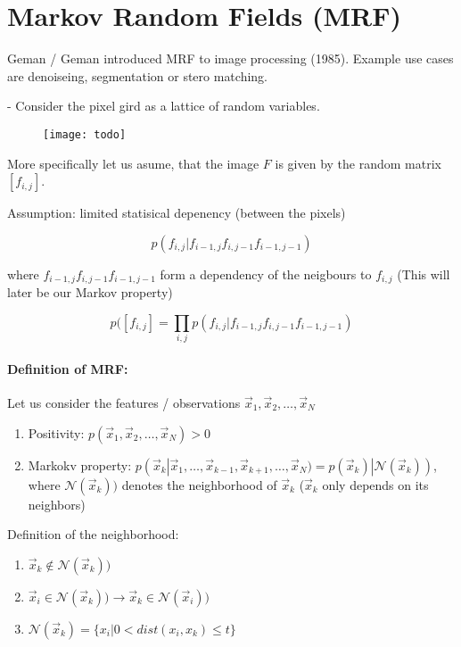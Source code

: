 
\section{Markov Random Fields (MRF)}

Geman / Geman introduced MRF to image processing (1985). Example use cases are denoiseing, segmentation or stero matching.

- Consider the pixel gird as a lattice of random variables.

\begin{figure}[H]
	\centering
	\texttt{[image: todo]}
\end{figure}

More specifically let us asume, that the image $F$ is given by the random matrix $[f_{i,j}]$.

Assumption: limited statisical depenency (between the pixels)

\begin{equation*}
    p(f_{i, j} | f_{i-1, j} f_{i, j-1} f_{i-1, j-1})
\end{equation*}

where $f_{i-1, j} f_{i, j-1} f_{i-1, j-1}$ form a dependency of the neigbours to $f_{i,j}$ (This will later be our Markov property)

\begin{equation*}
    p([f_{i, j}] = \prod_{i,j} p(f_{i, j} | f_{i-1, j} f_{i, j-1} f_{i-1, j-1})
\end{equation*}

\paragraph{Definition of MRF:\\}

Let us consider the features / observations $\vec{x}_1, \vec{x}_2, \dots, \vec{x}_N$
\begin{enumerate}
    \item Positivity: $ p(\vec{x}_1, \vec{x}_2, \dots, \vec{x}_N) > 0$
    \item Markokv property: $ p(\vec{x}_k |\vec{x}_1, \dots, \vec{x}_{k-1}, \vec{x}_{k+1}, \dots, \vec{x}_N) = p(\vec{x}_k) | \mathcal{N}(\vec{x}_k)) $, where $\mathcal{N}(\vec{x}_k))$ denotes the neighborhood of $\vec{x}_k$ ($\vec{x}_k$ only depends on its neighbors)
\end{enumerate}

Definition of the neighborhood:
\begin{enumerate}
	\item $\vec{x}_k \notin \mathcal{N}(\vec{x}_k))$
	\item $\vec{x}_i \in \mathcal{N}(\vec{x}_k)) \rightarrow \vec{x}_k \in \mathcal{N}(\vec{x}_i))$
	\item $\mathcal{N}(\vec{x}_k) = \{x_i|0 < dist(x_i, x_k) \le t\}$
\end{enumerate}


